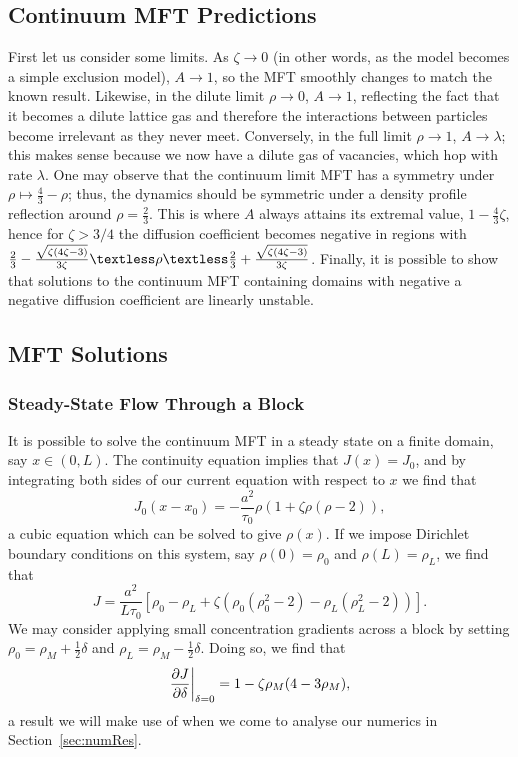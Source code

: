 \subsection{Continuum MFT Predictions}
First let us consider some limits. As $\zeta \rightarrow 0$ (in other words, as the model becomes a simple exclusion model), $A \rightarrow 1$, so the MFT smoothly changes to match the known result. Likewise, in the
dilute limit $\rho \rightarrow 0$, $A \rightarrow 1$, reflecting the fact that it becomes a dilute lattice gas and therefore the interactions between particles become irrelevant as they never meet.
Conversely, in the full limit $\rho \rightarrow 1$, $A \rightarrow \lambda$; this makes sense because we now have a dilute gas of vacancies, which hop with rate $\lambda$.
One may observe that the continuum limit MFT has a symmetry under $\rho \mapsto \frac{4}{3} - \rho$; thus, the dynamics should be symmetric under a density profile reflection around $\rho = \frac{2}{3}$. This is where $A$ always
attains its extremal value, $ 1 - \frac{4}{3}\zeta$, hence for $\zeta>3/4$ the diffusion coefficient becomes negative in regions with
$\frac{2}{3} - \frac{\sqrt{\zeta\left(4\zeta - 3\right)}}{3\zeta} \textless \rho \textless \frac{2}{3} + \frac{\sqrt{\zeta\left(4\zeta - 3\right)}}{3\zeta}$.
Finally, it is possible to show that solutions to the continuum MFT containing domains with negative a negative diffusion coefficient are linearly unstable.
\subsection{MFT Solutions}
\subsubsection{Steady-State Flow Through a Block}
It is possible to solve the continuum MFT in a steady state on a finite domain, say $x\in(0, L)$. The continuity equation implies that $J(x)=J_0$, and by integrating both sides of our current equation with respect to $x$ we find that
\begin{equation}
 J_0 (x-x_0) = -\frac{a^2}{\tau_0} \rho \left(1+\zeta \rho\left(\rho-2\right)\right),
\end{equation}
a cubic equation which can be solved to give $\rho(x)$. If we impose Dirichlet boundary conditions on this system, say $\rho(0)=\rho_0$ and $\rho(L)=\rho_L$, we find that
\begin{equation}
 J = \frac{a^2}{L \tau_0} \left[ \rho_0 - \rho_L + \zeta \left( \rho_0\left(\rho_0^2-2\right) - \rho_L\left(\rho_L^2-2\right) \right) \right].
\end{equation}
We may consider applying small concentration gradients across a block by setting $\rho_0 = \rho_M + \frac{1}{2}\delta$ and $\rho_L = \rho_M - \frac{1}{2}\delta$. Doing so, we find that
\begin{equation}
 \frac{\partial J}{\partial \delta}\bigg|_{\delta=0} = 1 - \zeta\rho_M(4-3\rho_M),
\end{equation}
a result we will make use of when we come to analyse our numerics in Section~\ref{sec:numRes}.
